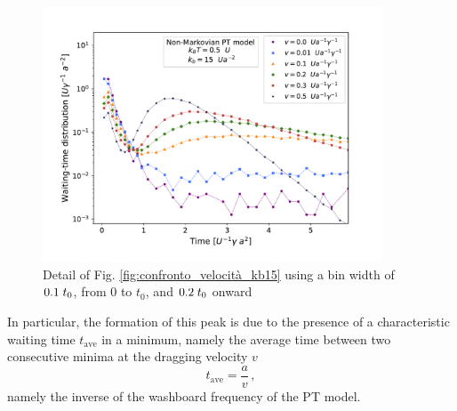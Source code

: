 \begin{figure}
    \centering
    \includegraphics[width=0.9\textwidth]{zoom_kb15.pdf}
    \caption{Detail of Fig. \ref{fig:confronto_velocità_kb15} using a bin width of $0.1\hspace{0.1cm}t_0$, from $0$ to $t_0$, and $0.2\hspace{0.1cm}t_0$ onward}
    \label{fig:zoom_kb15}
\end{figure}
\newpage
In particular, the formation of this peak is due to the presence of a characteristic waiting time $t_\text{ave}$ in a minimum, namely the average time between two consecutive minima at the dragging velocity $v$
\begin{equation}
    t_\text{ave} = \dfrac{a}{v}\, ,
\end{equation}
namely the inverse of the washboard frequency of the PT model.

